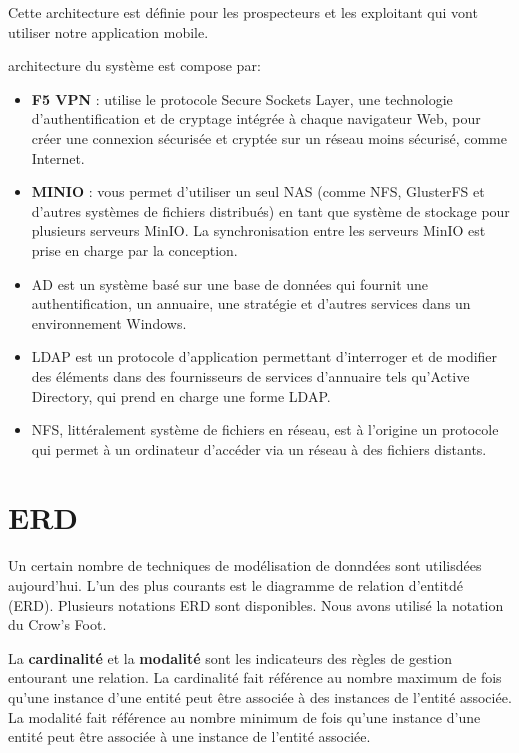 Cette architecture est d\'efinie pour les prospecteurs et les exploitant qui vont utiliser notre application mobile.

architecture du syst\`eme est compose par:
\begin{itemize}
\item \textbf{F5 VPN} : utilise le protocole Secure Sockets Layer, une technologie d'authentification et de cryptage int\'egr\'ee \`a chaque navigateur Web, pour cr\'eer une connexion s\'ecuris\'ee et crypt\'ee sur un r\'eseau moins s\'ecuris\'e, comme Internet.
\item \textbf{MINIO} : vous permet d'utiliser un seul NAS (comme NFS, GlusterFS et d'autres systèmes de fichiers distribu\'es) en tant que syst\`eme de stockage pour plusieurs serveurs MinIO. La synchronisation entre les serveurs MinIO est prise en charge par la conception.
\item \gls{AD} est un syst\`eme bas\'e sur une base de donn\'ees qui fournit une authentification, un annuaire, une strat\'egie et d'autres services dans un environnement Windows.
\item \gls{LDAP} est un protocole d'application permettant d'interroger et de modifier des \'el\'ements dans des fournisseurs de services d'annuaire tels qu'Active Directory, qui prend en charge une forme LDAP.
\item \gls{NFS}, litt\'eralement système de fichiers en r\'eseau, est \`a l'origine un protocole qui permet \`a un ordinateur d'acc\'eder via un r\'eseau \`a des fichiers distants.
\end{itemize}

\section{\gls{ERD}}
Un certain nombre de techniques de mod\'elisation de donnd\'ees sont utilisd\'ees aujourd'hui. L'un des plus courants est le diagramme de relation d'entitd\'e (\gls{ERD}). Plusieurs notations \gls{ERD} sont disponibles. Nous avons utilis\'e la notation du Crow's Foot.

La \textbf{cardinalit\'e} et la \textbf{modalit\'e} sont les indicateurs des r\`egles de gestion entourant une relation. La cardinalit\'e fait r\'ef\'erence au nombre maximum de fois qu'une instance d'une entit\'e peut \^etre associ\'ee \`a des instances de l'entit\'e associ\'ee. La modalit\'e fait r\'ef\'erence au nombre minimum de fois qu'une instance d'une entit\'e peut \^etre associ\'ee \`a une instance de l'entit\'e associ\'ee.

